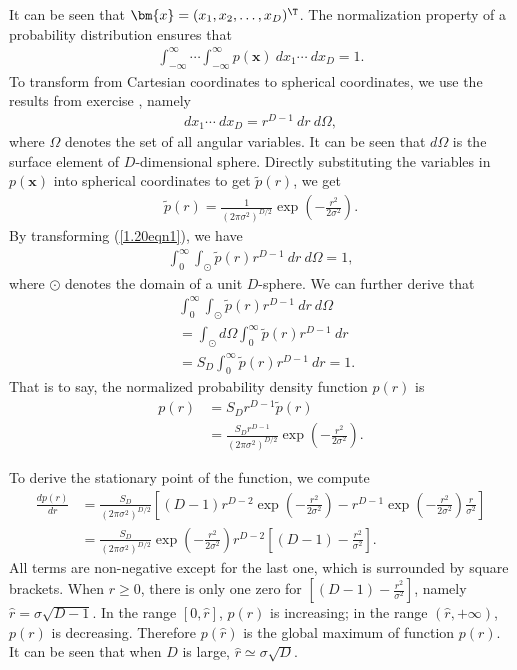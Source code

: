 \begin{answer}{}
	It can be seen that $\bm{x} = (x_1, x_2, \ldots, x_D)^{\T}$. The normalization property of a probability distribution ensures that
	\begin{align}\label{1.20eqn1}
		\int_{-\infty}^{\infty}\cdots \int_{-\infty}^{\infty} p(\bm{x})\ dx_1\cdots\ dx_D = 1.
	\end{align}
	To transform from Cartesian coordinates to spherical coordinates, we use the results from exercise , namely
	\begin{align}
		dx_1\cdots\ dx_D = r^{D-1}\ dr\ d\Omega,
	\end{align}
	where $\Omega$ denotes the set of all angular variables. It can be seen that $d\Omega$ is the surface element of $D$-dimensional sphere. Directly substituting the variables in $p(\bm{x})$ into spherical coordinates to get $\tilde{p}(r)$, we get
	\begin{align}
		\tilde{p}(r) = \frac{1}{(2\pi\sigma^2)^{D/2}} \exp\left( -\frac{r^2}{2\sigma^2} \right).
	\end{align}
	By transforming (\ref{1.20eqn1}), we have
	\begin{align}
		\int_{0}^{\infty}\int_{\odot} \tilde{p}(r) r^{D-1}\ dr\ d\Omega = 1,
	\end{align}
	where $\odot$ denotes the domain of a unit $D$-sphere. We can further derive that
	\begin{align}
		&\int_{0}^{\infty}\int_{\odot} \tilde{p}(r) r^{D-1}\ dr\ d\Omega\\
		&= \int_{\odot}d\Omega \int_{0}^{\infty} \tilde{p}(r) r^{D-1}\ dr\\
		&= S_D \int_{0}^{\infty} \tilde{p}(r) r^{D-1}\ dr = 1.
	\end{align}
	That is to say, the normalized probability density function $p(r)$ is
	\begin{align}
		p(r) &= S_D r^{D-1} \tilde{p}(r)\\
		&= \frac{S_D r^{D-1}}{(2\pi\sigma^2)^{D/2}} \exp\left( -\frac{r^2}{2\sigma^2} \right).
	\end{align}

	To derive the stationary point of the function, we compute
	\begin{align}
		\frac{dp(r)}{dr} &= \frac{S_D}{(2\pi\sigma^2)^{D/2}}\left[ (D-1)r^{D-2}\exp\left( -\frac{r^2}{2\sigma^2}\right) - r^{D-1}\exp\left(-\frac{r^2}{2\sigma^2}\right)\frac{r}{\sigma^2} \right]\\
		&= \frac{S_D}{(2\pi\sigma^2)^{D/2}}\exp\left( -\frac{r^2}{2\sigma^2}\right)r^{D-2}\left[(D-1) - \frac{r^2}{\sigma^2}\right].
	\end{align}
	All terms are non-negative except for the last one, which is surrounded by square brackets. When $r \geq 0$, there is only one zero for $\left[(D-1) - \frac{r^2}{\sigma^2}\right]$, namely $\hat{r} = \sigma\sqrt{D-1}$. In the range $[0, \hat{r}]$, $p(r)$ is increasing; in the range $(\hat{r}, +\infty)$, $p(r)$ is decreasing. Therefore $p(\hat{r})$ is the global maximum of function $p(r)$. It can be seen that when $D$ is large, $\hat{r} \simeq \sigma\sqrt{D}$.
	

\end{answer}
